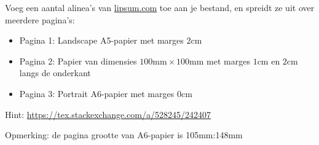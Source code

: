 \documentclass[a4paper]{article}
\begin{document}
    \begin{exercise}[pageref]
        
    \end{exercise}

    \begin{exercise}
        Voeg een aantal alinea's van \href{https://lipsum.com}{lipsum.com} toe aan je bestand, en spreidt
        ze uit over meerdere pagina's:
        \begin{itemize}
            \item Pagina 1: Landscape A5-papier met marges $ 2\text{cm} $
            \item Pagina 2: Papier van dimensies $ 100\text{mm}\times 100\text{mm} $
            met marges $ 1\text{cm} $ en $ 2\text{cm} $ langs de onderkant
            \item Pagina 3: Portrait A6-papier met marges $ 0\text{cm} $
        \end{itemize}

        Hint: \url{https://tex.stackexchange.com/a/528245/242407}

        Opmerking: de pagina grootte van A6-papier is 105mm:148mm
    \end{exercise}
\end{document}

